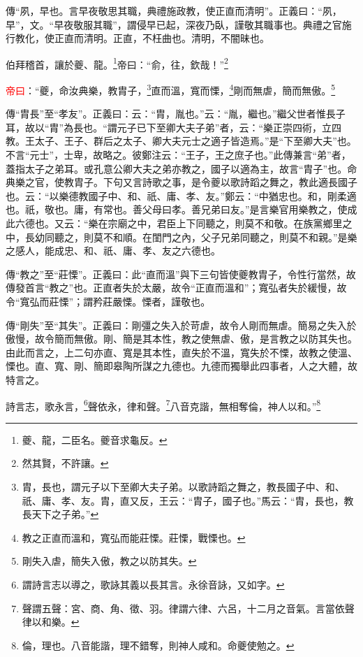 {\noindent\zhuan{}\fzbyks 傳“夙，早也。言早夜敬思其職，典禮施政教，使正直而清明”。正義曰：“夙，早”，文。“早夜敬服其職”，謂侵早已起，深夜乃臥，謹敬其職事也。典禮之官施行教化，使正直而清明。正直，不枉曲也。清明，不闇昧也。 \par}

伯拜稽首，讓於夔、龍。\footnote{夔、龍，二臣名。夔音求龜反。}帝曰：“俞，往，欽哉！”\footnote{然其賢，不許讓。}

\textcolor{red}{帝曰}：“夔，命汝典樂，教胄子，\footnote{胄，長也，謂元子以下至卿大夫子弟。以歌詩蹈之舞之，教長國子中、和、祇、庸、孝、友。胄，直又反，王云：“胄子，國子也。”馬云：“胄，長也，教長天下之子弟。”}直而溫，寬而慄，\footnote{教之正直而溫和，寬弘而能莊慄。莊慄，戰慄也。}剛而無虐，簡而無傲。\footnote{剛失入虐，簡失入傲，教之以防其失。}

{\noindent\zhuan{}\fzbyks 傳“胄長”至“孝友”。正義曰：云：“胄，胤也。”云：“胤，繼也。”繼父世者惟長子耳，故以“胄”為長也。“謂元子已下至卿大夫子弟”者，云：“樂正崇四術，立四教。王太子、王子、群后之太子、卿大夫元士之適子皆造焉。”是“下至卿大夫”也。不言“元士”，士卑，故略之。彼鄭注云：“王子，王之庶子也。”此傳兼言“弟”者，蓋指太子之弟耳。或孔意公卿大夫之弟亦教之，國子以適為主，故言“胄子”也。命典樂之官，使教胄子。下句又言詩歌之事，是令夔以歌詩蹈之舞之，教此適長國子也。云：“以樂德教國子中、和、祇、庸、孝、友。”鄭云：“中猶忠也。和，剛柔適也。祇，敬也。庸，有常也。善父母曰孝。善兄弟曰友。”是言樂官用樂教之，使成此六德也。又云：“樂在宗廟之中，君臣上下同聽之，則莫不和敬。在族黨鄉里之中，長幼同聽之，則莫不和順。在閨門之內，父子兄弟同聽之，則莫不和親。”是樂之感人，能成忠、和、祇、庸、孝、友之六德也。 \par}

{\noindent\zhuan{}\fzbyks 傳“教之”至“莊慄”。正義曰：此“直而溫”與下三句皆使夔教胄子，令性行當然，故傳發首言“教之”也。正直者失於太嚴，故令“正直而溫和”；寬弘者失於緩慢，故令“寬弘而莊慄”；謂矜莊嚴慄。慄者，謹敬也。 \par}

{\noindent\zhuan{}\fzbyks 傳“剛失”至“其失”。正義曰：剛彊之失入於苛虐，故令人剛而無虐。簡易之失入於傲慢，故令簡而無傲。剛、簡是其本性，教之使無虐、傲，是言教之以防其失也。由此而言之，上二句亦直、寬是其本性，直失於不溫，寬失於不慄，故教之使溫、慄也。直、寬、剛、簡即皋陶所謀之九德也。九德而獨舉此四事者，人之大體，故特言之。 \par}

詩言志，歌永言，\footnote{謂詩言志以導之，歌詠其義以長其言。永徐音詠，又如字。}聲依永，律和聲。\footnote{聲謂五聲：宮、商、角、徵、羽。律謂六律、六呂，十二月之音氣。言當依聲律以和樂。}八音克諧，無相奪倫，神人以和。”\footnote{倫，理也。八音能諧，理不錯奪，則神人咸和。命夔使勉之。}

